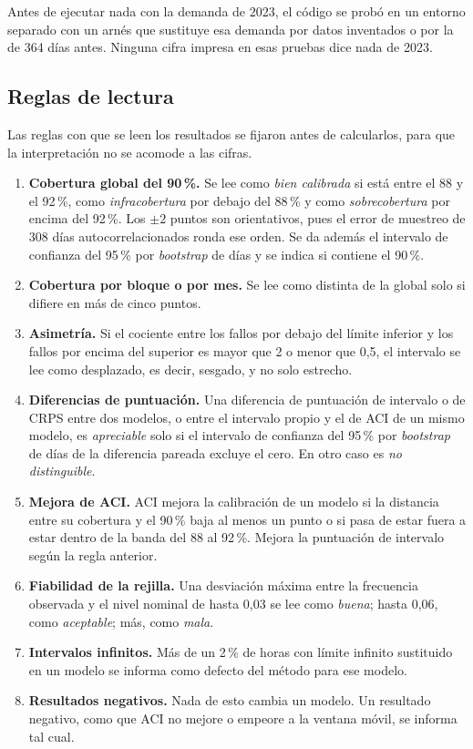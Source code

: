 Antes de ejecutar nada con la demanda de 2023, el código se probó en un
entorno separado con un arnés que sustituye esa demanda por datos inventados o
por la de 364 días antes. Ninguna cifra impresa en esas pruebas dice nada de
2023.

\subsection{Reglas de lectura}\label{sec:prob-lectura}

Las reglas con que se leen los resultados se fijaron antes de calcularlos, para
que la interpretación no se acomode a las cifras.

\begin{enumerate}
	\item \textbf{Cobertura global del 90\,\%.} Se lee como \emph{bien
	calibrada} si está entre el 88 y el 92\,\%, como \emph{infracobertura} por
	debajo del 88\,\% y como \emph{sobrecobertura} por encima del 92\,\%. Los
	$\pm 2$ puntos son orientativos, pues el error de muestreo de 308 días
	autocorrelacionados ronda ese orden. Se da además el intervalo de confianza
	del 95\,\% por \textit{bootstrap} de días y se indica si contiene el 90\,\%.
	\item \textbf{Cobertura por bloque o por mes.} Se lee como distinta de la
	global solo si difiere en más de cinco puntos.
	\item \textbf{Asimetría.} Si el cociente entre los fallos por debajo del
	límite inferior y los fallos por encima del superior es mayor que 2 o menor
	que 0,5, el intervalo se lee como desplazado, es decir, sesgado, y no solo
	estrecho.
	\item \textbf{Diferencias de puntuación.} Una diferencia de puntuación de
	intervalo o de CRPS entre dos modelos, o entre el intervalo propio y el de
	ACI de un mismo modelo, es \emph{apreciable} solo si el intervalo de
	confianza del 95\,\% por \textit{bootstrap} de días de la diferencia pareada
	excluye el cero. En otro caso es \emph{no distinguible}.
	\item \textbf{Mejora de ACI.} ACI mejora la calibración de un modelo si la
	distancia entre su cobertura y el 90\,\% baja al menos un punto o si pasa de
	estar fuera a estar dentro de la banda del 88 al 92\,\%. Mejora la
	puntuación de intervalo según la regla anterior.
	\item \textbf{Fiabilidad de la rejilla.} Una desviación máxima entre la
	frecuencia observada y el nivel nominal de hasta 0,03 se lee como
	\emph{buena}; hasta 0,06, como \emph{aceptable}; más, como \emph{mala}.
	\item \textbf{Intervalos infinitos.} Más de un 2\,\% de horas con límite
	infinito sustituido en un modelo se informa como defecto del método para
	ese modelo.
	\item \textbf{Resultados negativos.} Nada de esto cambia un modelo. Un
	resultado negativo, como que ACI no mejore o empeore a la ventana móvil, se
	informa tal cual.
\end{enumerate}

